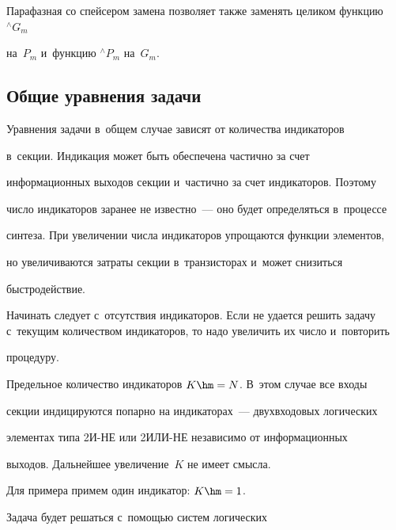    


   Парафазная со спейсером замена позволяет также заменять целиком функцию ${}^\wedge G_m$ 


на~$P_m$ и~функцию ${}^\wedge P_m$ на~$G_m$.





\subsection{Общие уравнения задачи}


       


   Уравнения задачи в~общем случае зависят от количества индикаторов 


в~секции. Индикация может быть обеспечена частично за счет 


информационных выходов секции и~частично за счет индикаторов. Поэтому 


число индикаторов заранее не известно~--- оно будет определяться в~процессе 


синтеза. При увеличении числа индикаторов упрощаются функции элементов, 


но увеличиваются затраты секции в~транзисторах и~может снизиться 


быстродействие.


   


   Начинать следует с~отсутствия индикаторов. Если не удается решить задачу с~текущим количеством индикаторов, то надо увеличить их число и~повторить 


процедуру.


   


   Предельное количество индикаторов $K\hm = N$. В~этом случае все входы 


секции индицируются попарно на индикаторах~--- двухвходовых логических 


элементах типа 2И-НЕ или 2ИЛИ-НЕ независимо от информационных 


выходов. Дальнейшее увеличение~$K$ не имеет смысла.


   


   Для примера примем один индикатор: $K\hm = 1$.


   


   Задача будет решаться с~помощью систем логических  


